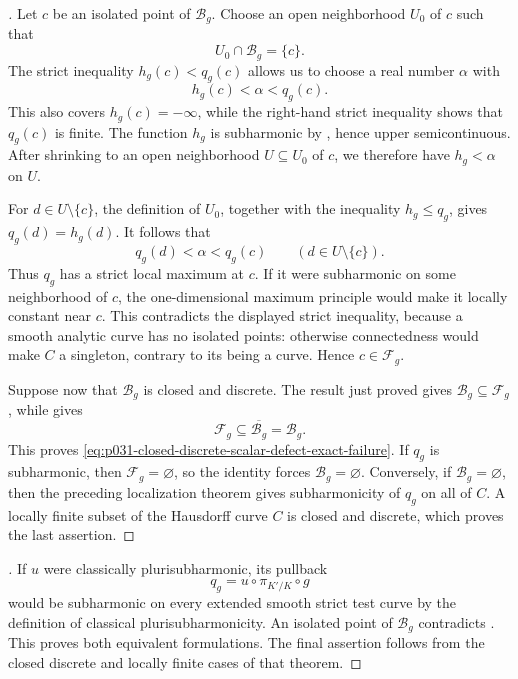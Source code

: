 
\begin{proof}[]
Let $c$ be an isolated point of $\mathcal B_g$.  Choose an open
neighborhood $U_0$ of $c$ such that
\[
                         U_0\cap\mathcal B_g=\{c\}.
\]
The strict inequality $h_g(c)<q_g(c)$ allows us to choose a real number
$\alpha$ with
\[
                         h_g(c)<\alpha<q_g(c).
\]
This also covers $h_g(c)=-\infty$, while the right-hand strict inequality
shows that $q_g(c)$ is finite.  The function $h_g$ is subharmonic by
, hence upper
semicontinuous.  After shrinking to an open neighborhood $U\subseteq U_0$
of $c$, we therefore have $h_g<\alpha$ on $U$.

For $d\in U\setminus\{c\}$, the definition of $U_0$, together with
the inequality $h_g\leq q_g$, gives $q_g(d)=h_g(d)$.  It follows that
\[
                    q_g(d)<\alpha<q_g(c)
                    \qquad(d\in U\setminus\{c\}).
\]
Thus $q_g$ has a strict local maximum at $c$.  If it were subharmonic
on some neighborhood of $c$, the one-dimensional maximum principle
\cite[Proposition~3.1.11]{Thu05} would make it locally constant near $c$.
This contradicts the displayed strict inequality, because a smooth analytic
curve has no isolated points: otherwise connectedness would make $C$ a
singleton, contrary to its being a curve.  Hence $c\in\mathcal F_g$.

Suppose now that $\mathcal B_g$ is closed and discrete.  The result just
proved gives $\mathcal B_g\subseteq\mathcal F_g$, while
 gives
\[
                \mathcal F_g\subseteq\overline{\mathcal B_g}
                =\mathcal B_g.
\]
This proves \eqref{eq:p031-closed-discrete-scalar-defect-exact-failure}.
If $q_g$ is subharmonic, then $\mathcal F_g=\varnothing$, so the
identity forces $\mathcal B_g=\varnothing$.  Conversely, if
$\mathcal B_g=\varnothing$, then the preceding localization theorem gives
subharmonicity of $q_g$ on all of $C$.  A locally finite subset of the
Hausdorff curve $C$ is closed and discrete, which proves the last
assertion.
\end{proof}

\begin{proof}[]
If $u$ were classically plurisubharmonic, its pullback
\[
                         q_g=u\circ\pi_{K'/K}\circ g
\]
would be subharmonic on every extended smooth strict test curve by the
definition of classical plurisubharmonicity.  An isolated point of
$\mathcal B_g$ contradicts
.  This proves both
equivalent formulations.  The final assertion follows from the closed
discrete and locally finite cases of that theorem.
\end{proof}
